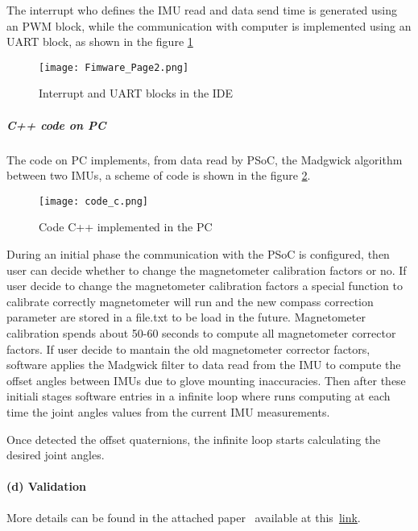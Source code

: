 \begin{enumerate}
\noindent The interrupt who defines the IMU read and data send time is generated using an PWM block, while the communication with computer is implemented using an UART block, as shown in the figure \ref{fig:firmwarepage1}


\begin{figure}[h]
\centering
\texttt{[image: Fimware\_Page2.png]}
\caption{Interrupt and UART blocks in the IDE}
\label{fig:firmwarepage1}
\end{figure}  
\end{enumerate} 

\subparagraph{C++ code on PC}
The code on PC implements, from data read by PSoC, the Madgwick algorithm between two IMUs, a scheme of code is shown in the figure \ref{fig:code_c}.  

\begin{figure}[h]
\centering
\texttt{[image: code\_c.png]}
\caption{Code C++ implemented in the PC}
\label{fig:code_c}
\end{figure}  

During an initial phase the communication with the PSoC is configured, then user can decide whether to change the magnetometer calibration factors or no. If user decide to change the magnetometer calibration factors a special function 
to calibrate correctly magnetometer will run and the new compass correction parameter are stored in a file.txt to be load in the future. Magnetometer calibration spends about 50-60 seconds to compute all magnetometer corrector factors. 
If user decide to mantain the old magnetometer corrector factors, software applies the Madgwick filter to data read from the IMU to compute the offset angles between IMUs due to glove mounting inaccuracies. Then after these initiali stages software entries in a infinite loop where runs computing at each time the joint angles values from the current IMU measurements. 


Once detected the offset quaternions, the infinite loop starts calculating the desired joint angles.

 
\paragraph{(d) Validation}

More details can be found in the attached paper~\cite{Santaera:ICRA:2015} available at this~\href{./attachedPapers/ReconstructionPosturesImuMeasurements.pdf}{link}.
